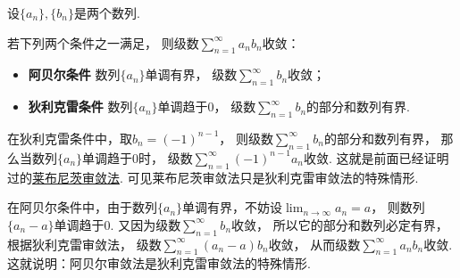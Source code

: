 \begin{theorem}\label{theorem:无穷级数.无穷级数的阿贝尔--狄利克雷审敛法}
设\(\{a_n\},\{b_n\}\)是两个数列.

若下列两个条件之一满足，
则级数\(\sum_{n=1}^\infty a_n b_n\)收敛：\begin{itemize}
	\item {\bf 阿贝尔条件}
	数列\(\{a_n\}\)单调有界，
	级数\(\sum_{n=1}^\infty b_n\)收敛；

	\item {\bf 狄利克雷条件}
	数列\(\{a_n\}\)单调趋于\(0\)，
	级数\(\sum_{n=1}^\infty b_n\)的部分和数列有界.
\end{itemize}
\end{theorem}
\begin{remark}
在狄利克雷条件中，取\(b_n = (-1)^{n-1}\)，
则级数\(\sum_{n=1}^\infty b_n\)的部分和数列有界，
那么当数列\(\{a_n\}\)单调趋于\(0\)时，
级数\(\sum_{n=1}^\infty (-1)^{n-1} a_n\)收敛.
这就是前面已经证明过的\hyperref[theorem:无穷级数.莱布尼茨定理]{莱布尼茨审敛法}.
可见莱布尼茨审敛法只是狄利克雷审敛法的特殊情形.

在阿贝尔条件中，由于数列\(\{a_n\}\)单调有界，不妨设\(\lim_{n\to\infty} a_n = a\)，
则数列\(\{a_n - a\}\)单调趋于\(0\).
又因为级数\(\sum_{n=1}^\infty b_n\)收敛，
所以它的部分和数列必定有界，根据狄利克雷审敛法，
级数\(\sum_{n=1}^\infty (a_n - a) b_n\)收敛，
从而级数\(\sum_{n=1}^\infty a_n b_n\)收敛.
这就说明：阿贝尔审敛法是狄利克雷审敛法的特殊情形.
\end{remark}
